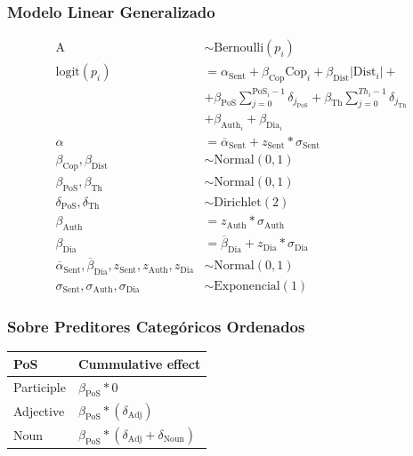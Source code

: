 \documentclass[10pt]{beamer}
\newcommand{\Bernoulli}{\text{Bernoulli}}
\newcommand{\Normal}{\text{Normal}}
\newcommand{\Dirichlet}{\text{Dirichlet}}
\newcommand{\Exponencial}{\text{Exponencial}}
\newcommand{\logit}{\text{logit}}
\newcommand{\Dist}{\text{Dist}}
\newcommand{\Cop}{\text{Cop}}
\newcommand{\Sent}{\text{Sent}}
\newcommand{\Auth}{\text{Auth}}
\newcommand{\PoS}{\text{PoS}}
\newcommand{\Th}{\text{Th}}
\newcommand{\Dia}{\text{Dia}}
\newcommand{\abar}{\overline{\alpha}}
\newcommand{\bbar}{\overline{\beta}}
\newcommand{\bv}[1]{\beta_\text{#1}}
\newcommand{\bvi}[1]{\beta_{\text{#1}_i}}
\begin{document}
\begin{frame}
  \frametitle{Modelo Linear Generalizado}
  \small
  \begin{align*}
    \text{A}                                                & \sim \Bernoulli(p_i)                                     \\
    \logit(p_i)                                             & = \alpha_{\Sent} + \bv{Cop}\Cop_i + \bv{Dist}|\Dist_i| + \\
                                                            & +
    \bv{PoS}\sum^{\PoS_{i}-1}_{j=0}{\delta_{j_{\PoS}}} +\bv{Th}\sum^{Th_{i}-1}_{j=0}{\delta_{j_{\Th}}}                 \\
                                                            & + \bvi{Auth} + \bvi{Dia}                                 \\
    \alpha                                                  & = \abar_\Sent + z_{\Sent} * \sigma_\Sent                 \\
    \bv{Cop}, \bv{Dist}                                     & \sim \Normal(0, 1)                                       \\
    \bv{PoS}, \bv{Th}                                       & \sim \Normal(0, 1)                                       \\
    \delta_{\PoS}, \delta_{\Th}                             & \sim \Dirichlet(2)                                       \\
    \bv{Auth}                                               & = z_{\Auth}*\sigma_{\Auth}                               \\
    \bv{Dia}                                                & = \bbar_\Dia + z_{\Dia}*\sigma_{\Dia}                    \\
    \abar_\Sent, \bbar_\Dia, z_{\Sent}, z_{\Auth}, z_{\Dia} & \sim \Normal(0,1)                                        \\
    \sigma_{\Sent}, \sigma_{\Auth}, \sigma_{\Dia}           & \sim \Exponencial(1)
  \end{align*}
\end{frame}

\begin{frame}
  \frametitle{Sobre Preditores Categóricos Ordenados}

  \begin{center}
    \begin{tabular}[t]{ll}
      \toprule
      PoS        & Cummulative effect                                                  \\
      \midrule
      Participle & $\beta_{\text{PoS}} * 0$                                            \\
      Adjective  & $\beta_{\text{PoS}} * (\delta_{\text{Adj}})$                        \\
      Noun       & $\beta_{\text{PoS}} * (\delta_{\text{Adj}} + \delta_{\text{Noun}})$ \\
      \bottomrule
    \end{tabular}
  \end{center}

\end{frame}
\end{document}
